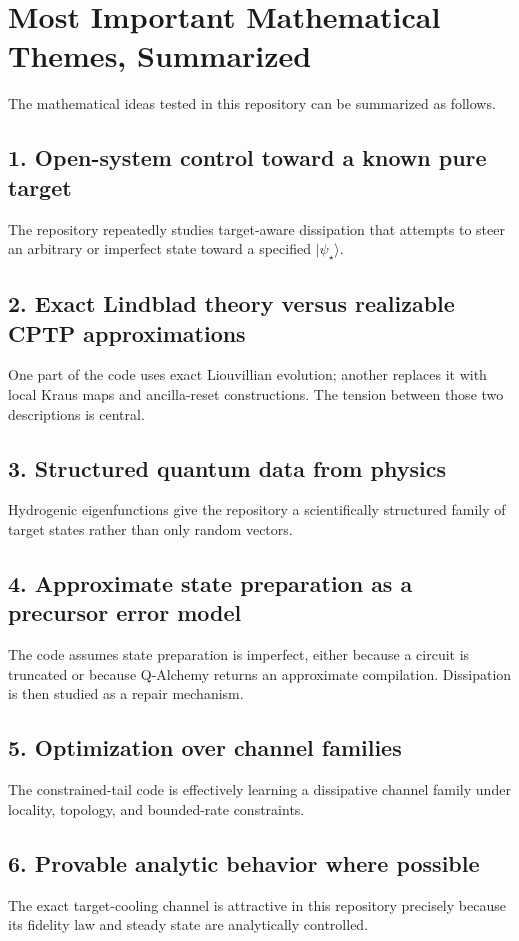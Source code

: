 \documentclass[11pt,a4paper]{article}
\begin{document}
\section{Most Important Mathematical Themes, Summarized}
The mathematical ideas tested in this repository can be summarized as follows.

\subsection*{1. Open-system control toward a known pure target}
The repository repeatedly studies target-aware dissipation that attempts to steer an arbitrary or imperfect state toward a specified $\lvert \psi_\star\rangle$.

\subsection*{2. Exact Lindblad theory versus realizable CPTP approximations}
One part of the code uses exact Liouvillian evolution; another replaces it with local Kraus maps and ancilla-reset constructions. The tension between those two descriptions is central.

\subsection*{3. Structured quantum data from physics}
Hydrogenic eigenfunctions give the repository a scientifically structured family of target states rather than only random vectors.

\subsection*{4. Approximate state preparation as a precursor error model}
The code assumes state preparation is imperfect, either because a circuit is truncated or because Q-Alchemy returns an approximate compilation. Dissipation is then studied as a repair mechanism.

\subsection*{5. Optimization over channel families}
The constrained-tail code is effectively learning a dissipative channel family under locality, topology, and bounded-rate constraints.

\subsection*{6. Provable analytic behavior where possible}
The exact target-cooling channel is attractive in this repository precisely because its fidelity law and steady state are analytically controlled.
\end{document}
